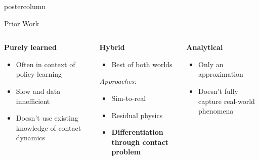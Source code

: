 \documentclass[final,hyperref={pdfpagelabels=false},5pt]{beamer}
\begin{document}
\begin{frame}
\begin{columns}
\begin{column}{.49\textwidth}
\begin{beamercolorbox}[center,wd=\textwidth]{postercolumn}
\begin{minipage}[T]{.95\textwidth}
{            \begin{block}{Prior Work}
                \begin{columns}[t]
                    \begin{column}{0.3\textwidth}
                        \textbf{Purely learned}
                        \begin{itemize}
                            \item Often in context of policy learning
                            \item Slow and data innefficient
                            \item Doesn't use existing knowledge of contact dynamics
                        \end{itemize}
                    \end{column}

                    \begin{column}{0.3\textwidth}
                        \textbf{Hybrid}
                        \begin{itemize}
                            \item Best of both worlds
                        \end{itemize}
                        \begin{center}
                            \textit{Approaches:}
                        \end{center}
                        \begin{itemize}
                            \item Sim-to-real
                            \item Residual physics
                            \item \textbf{Differentiation through contact problem}
                        \end{itemize}
                    \end{column}

                    \begin{column}{0.3\textwidth}
                        \textbf{Analytical}
                        \begin{itemize}
                            \item Only an approximation
                            \item Doesn't fully capture real-world phenomena
                        \end{itemize}
                    \end{column}
                \end{columns}
            \end{block}
            

}
\end{minipage}
\end{beamercolorbox}
\end{column}
\end{columns}
\end{frame}
\end{document}
